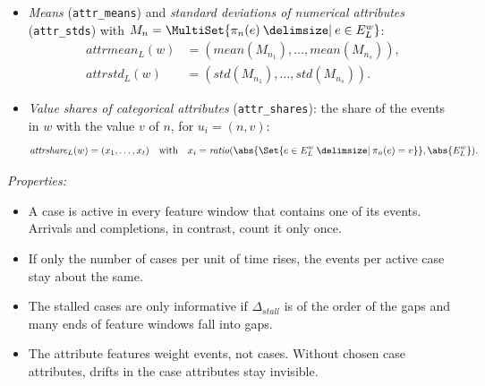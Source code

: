 \begin{definition}
\begin{itemize}
\[\begin{aligned}
			      \end{aligned}
		      \]
		\item \emph{Means} (\texttt{attr\_means}) and \emph{standard deviations of numerical attributes} (\texttt{attr\_stds}) with $M_n = \MultiSet{\pi_n(e) \given e \in E^w_L}$:
		      \[
			      \begin{aligned}
				      \mathit{attrmean}_L(w) & = (\mathit{mean}(M_{n_1}), \dots, \mathit{mean}(M_{n_s})), \\
				      \mathit{attrstd}_L(w)  & = (\mathit{std}(M_{n_1}), \dots, \mathit{std}(M_{n_s})).
			      \end{aligned}
		      \]
		\item \emph{Value shares of categorical attributes} (\texttt{attr\_shares}): the share of the events in $w$ with the value $v$ of $n$, for $u_i = (n, v)$:
		      \[
			      \mathit{attrshare}_L(w) = (x_1, \dots, x_t) \quad\text{with}\quad x_i = \mathit{ratio}(\abs{\Set{e \in E^w_L \given \pi_n(e) = v}}, \abs{E^w_L}).
		      \]
	\end{itemize}
\end{definition}

\noindent\emph{Properties:}
\begin{itemize}[beginpenalty=10000]
	\item A case is active in every feature window that contains one of its events. Arrivals and completions, in contrast, count it only once.
	\item If only the number of cases per unit of time rises, the events per active case stay about the same.
	\item The stalled cases are only informative if $\Delta_{\mathit{stall}}$ is of the order of the gaps and many ends of feature windows fall into gaps.
	\item The attribute features weight events, not cases. Without chosen case attributes, drifts in the case attributes stay invisible.
\end{itemize}

